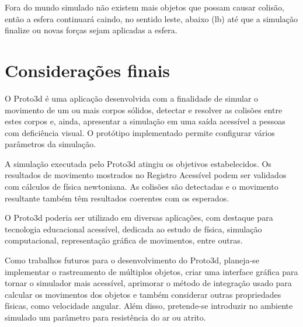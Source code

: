 \documentclass[12pt]{article}
\begin{document}
Fora do mundo simulado não existem mais objetos que possam causar colisão, então a esfera continuará caindo, no sentido leste, abaixo (lb) até que a simulação finalize ou novas forças sejam aplicadas a esfera.

%
%


\section{Considerações finais}
O Proto3d é uma aplicação desenvolvida com a finalidade de simular o movimento de um ou mais corpos sólidos, detectar e resolver as colisões entre estes corpos e, ainda, apresentar a simulação em uma saída acessível a pessoas com deficiência visual. O protótipo implementado permite configurar vários parâmetros da simulação. 

A simulação executada pelo Proto3d atingiu os objetivos estabelecidos. Os resultados de movimento mostrados no Registro Acessível podem ser validados com cálculos de física newtoniana. As colisões são detectadas e o movimento resultante também têm resultados coerentes com os esperados. 

O Proto3d poderia ser utilizado em diversas aplicações, com destaque para tecnologia educacional acessível, dedicada ao estudo de física, simulação computacional, representação gráfica de movimentos, entre outras.

Como trabalhos futuros para o desenvolvimento do Proto3d, planeja-se implementar o rastreamento de múltiplos objetos, criar uma interface gráfica para tornar o simulador mais acessível, aprimorar o método de integração usado para calcular os movimentos dos objetos e também considerar outras propriedades físicas, como velocidade angular. Além disso, pretende-se introduzir no ambiente simulado um parâmetro para resistência do ar ou atrito.





\end{document}
